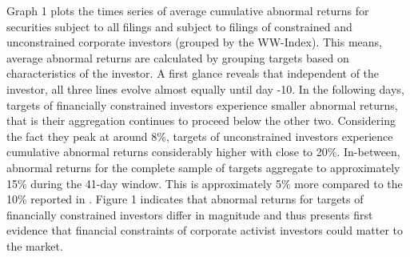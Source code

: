 \documentclass[12pt]{article}
\begin{document}
Graph 1 plots the times series of average cumulative abnormal returns for securities subject to all filings and subject to filings of constrained and unconstrained corporate investors (grouped by the WW-Index). This means, average abnormal returns are calculated by grouping targets based on characteristics of the investor. A first glance reveals that independent of the investor, all three lines evolve almost equally until day -10. In the following days, targets of financially constrained investors experience smaller abnormal returns, that is their aggregation continues to proceed below the other two. Considering the fact they peak at around 8\%, targets of unconstrained investors experience cumulative abnormal returns considerably higher with close to 20\%. In-between, abnormal returns for the complete sample of targets aggregate to approximately 15\% during the 41-day window. This is approximately 5\% more compared to the 10\% reported in \citet[p.1563]{Collin-Dufresne2015}. 
Figure 1 indicates that abnormal returns for targets of financially constrained investors differ in magnitude and thus presents first evidence that financial constraints of corporate activist investors could matter to the market.
\end{document}
